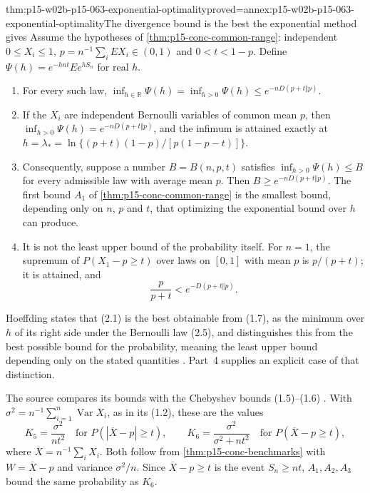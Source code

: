 \begin{hbtheorem}{thm:p15-w02b-p15-063-exponential-optimality}{proved=annex:p15-w02b-p15-063-exponential-optimality}{The divergence bound is the best the exponential method gives}
Assume the hypotheses of \cref{thm:p15-conc-common-range}: independent
\(0\leq X_i\leq1\), \(p=n^{-1}\sum_iEX_i\in(0,1)\) and \(0<t<1-p\).
Define \(\Psi(h)=e^{-hnt}Ee^{hS_n}\) for real \(h\).
\begin{enumerate}
\item For every such law,
 \(\inf_{h\in\mathbb R}\Psi(h)=\inf_{h>0}\Psi(h)\leq e^{-nD(p+t\Vert p)}\).
\item If the \(X_i\) are independent Bernoulli variables of common mean
 \(p\), then
 \(\inf_{h>0}\Psi(h)=e^{-nD(p+t\Vert p)}\), and the infimum is attained
 exactly at \(h=\lambda_*=\ln\{(p+t)(1-p)/[p(1-p-t)]\}\).
\item Consequently, suppose a number \(B=B(n,p,t)\) satisfies
 \(\inf_{h>0}\Psi(h)\leq B\) for every admissible law with average mean
 \(p\). Then \(B\geq e^{-nD(p+t\Vert p)}\). The first bound
 \(A_1\) of \cref{thm:p15-conc-common-range} is the smallest bound,
 depending only on \(n\), \(p\) and \(t\), that optimizing the exponential
 bound over \(h\) can produce.
\item It is not the least upper bound of the probability itself. For
 \(n=1\), the supremum of \(P(X_1-p\geq t)\) over laws on \([0,1]\) with
 mean \(p\) is \(p/(p+t)\); it is attained, and
 \[
             \frac p{p+t}<e^{-D(p+t\Vert p)}.
 \]
\end{enumerate}
Hoeffding states that (2.1) is the best obtainable from (1.7), as the
minimum over \(h\) of its right side under the Bernoulli law (2.5), and
distinguishes this from the best possible bound for the probability,
meaning the least upper bound depending only on the stated quantities
\cite[p.~14 and n.~3; p.~15]{Hoeffding1963BoundedSums}. Part~4 supplies
an explicit case of that distinction.
\end{hbtheorem}

The source compares its bounds with the Chebyshev bounds (1.5)--(1.6)
\cite[p.~13]{Hoeffding1963BoundedSums}. With
\(\sigma^2=n^{-1}\sum_{i=1}^n\operatorname{Var}X_i\), as in its (1.2),
these are the values
\[
 K_5=\frac{\sigma^2}{nt^2}\quad\text{for }P(|\overline X-p|\geq t),
 \qquad
 K_6=\frac{\sigma^2}{\sigma^2+nt^2}\quad\text{for }P(\overline X-p\geq t),
\]
where \(\overline X=n^{-1}\sum_iX_i\). Both follow from
\cref{thm:p15-conc-benchmarks} with \(W=\overline X-p\) and variance
\(\sigma^2/n\). Since \(\overline X-p\geq t\) is the event
\(S_n\geq nt\), \(A_1,A_2,A_3\) bound the same probability as \(K_6\).

